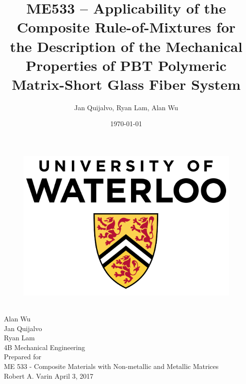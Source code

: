 \documentclass[11pt]{article}
\begin{document}
\doublespacing

\title{\textbf{ME533 -- Applicability of the Composite Rule-of-Mixtures for the Description of the Mechanical Properties of PBT Polymeric Matrix-Short Glass Fiber System}}
\author{Jan Quijalvo, Ryan Lam, Alan Wu}
\date{\today}


\makeatletter
    \singlespacing
    \begin{titlepage}
        \begin{center}
        	\begin{figure}[h]
        	\centering
            \includegraphics[scale=0.3]{./figures/University-of-Waterloo}
            \end{figure}
            \vspace{20mm}
            {\huge \bfseries  \@title }\\[2ex] 
            \vspace{5mm}
            {\LARGE Alan Wu}\\
            \vspace{2mm}
            {\LARGE Jan Quijalvo}\\
            \vspace{2mm}
            {\LARGE Ryan Lam}\\
            \vspace{2mm}
            \LARGE 4B Mechanical Engineering\\[12ex]
            Prepared for\\
            ME 533 - Composite Materials with Non-metallic and Metallic Matrices\\
            Robert A. Varin
            \centering
            \vfill
            {\large April 3, 2017}
        \end{center}
    \end{titlepage}
\makeatother
\end{document}
